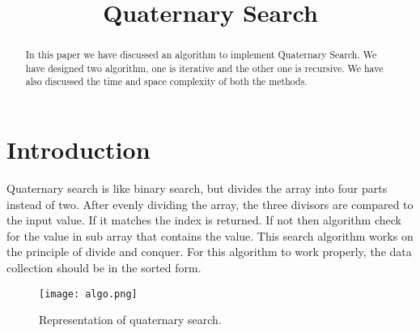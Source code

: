 \documentclass[conference]{IEEEtran}
\begin{document}
\title{\LARGE Quaternary Search}


 \author{
 }

\maketitle

\begin{abstract}
In this paper we have discussed an algorithm to implement Quaternary Search. We have designed two algorithm, one is iterative and the other one is recursive. We have also discussed the time and space complexity of both the methods.
\end{abstract}

\IEEEoverridecommandlockouts


\IEEEpeerreviewmaketitle



\section{Introduction}
Quaternary search is like binary search, but divides the array into four parts instead of two. After evenly dividing the array, the three divisors are compared to the input value. If it matches the index is returned. If not then algorithm check for the value in sub array that contains the value. This search algorithm works on the principle of divide and conquer. For this algorithm to work properly, the data collection should be in the sorted form.




\begin{figure}[ht!] %
\centering
\texttt{[image: algo.png]}
\caption{Representation of quaternary search.}
\label{Courant_2}
\end{figure}
\end{document}
